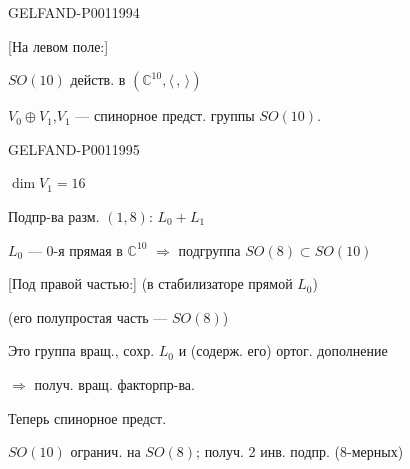 \begin{GelfandAdjacentEvidence}{GELFAND-P001199}{4}


[На левом поле:] 

$SO(10)$ действ. в $(\mathbb C^{10},\langle\, ,\,\rangle)$

$V_0\oplus V_1$,\quad $V_1$ --- спинорное предст. группы $SO(10)$.
\end{GelfandAdjacentEvidence}
\begin{GelfandAdjacentEvidence}{GELFAND-P001199}{5}


$\dim V_1=16$

Подпр-ва разм. $(1,8)$: $L_0+L_1$

$L_0$ --- 0-я прямая в $\mathbb C^{10}$ $\Longrightarrow$
подгруппа $SO(8)\subset SO(10)$

[Под правой частью:]
(в стабилизаторе прямой $L_0$)

(его полупростая часть --- $SO(8)$)

Это группа вращ., сохр. $L_0$ и (содерж. его) ортог. дополнение

$\Longrightarrow$ получ. вращ. факторпр-ва.

Теперь спинорное предст.
\end{GelfandAdjacentEvidence}

$SO(10)$ огранич. на $SO(8)$; получ. 2 инв. подпр. (8-мерных)


